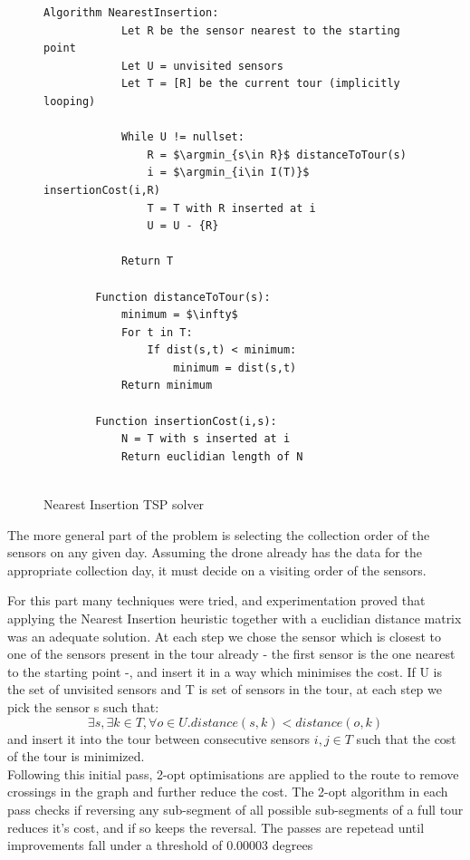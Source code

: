 \documentclass[10pt,a4paper]{article}
\DeclareMathOperator*{\argmin}{arg\,min}
\begin{document}
\begin{figure}[H]
    \begin{lstlisting}[style=mystyle]
        Algorithm NearestInsertion:
            Let R be the sensor nearest to the starting point
            Let U = unvisited sensors
            Let T = [R] be the current tour (implicitly looping)

            While U != nullset:
                R = $\argmin_{s\in R}$ distanceToTour(s) 
                i = $\argmin_{i\in I(T)}$ insertionCost(i,R)
                T = T with R inserted at i
                U = U - {R}
            
            Return T

        Function distanceToTour(s):
            minimum = $\infty$
            For t in T:
                If dist(s,t) < minimum:
                    minimum = dist(s,t)
            Return minimum
        
        Function insertionCost(i,s):
            N = T with s inserted at i
            Return euclidian length of N
        

    \end{lstlisting}
    \caption{Nearest Insertion TSP solver}
    \label{alg:ni}
\end{figure}

The more general part of the problem is selecting the collection order of the sensors on any given day.
Assuming the drone already has the data for the appropriate collection day, it must decide on a visiting order of the sensors.
\par 
For this part many techniques were tried, and experimentation proved that applying the Nearest Insertion heuristic together with a euclidian distance matrix was an adequate solution. 
At each step we chose the sensor which is closest to one of the sensors present in the tour already - the first sensor is the one nearest to the starting point -, and insert it in a way which minimises the cost.
If U is the set of unvisited sensors and T is set of sensors in the tour, at each step we pick the sensor s such that:
\begin{equation}
    \exists s,\exists k \in T,\forall o\in U.distance(s,k) < distance(o,k)
\end{equation} 
and insert it into the tour between consecutive sensors $i,j \in T$ such that the cost of the tour is minimized.
\\
Following this initial pass, 2-opt optimisations are applied to the route to remove crossings in the graph and further reduce the cost.
The 2-opt algorithm in each pass checks if reversing any sub-segment of all possible sub-segments of a full tour reduces it's cost, and if so keeps the reversal. 
The passes are repetead until improvements fall under a threshold of 0.00003 degrees
\end{document}
